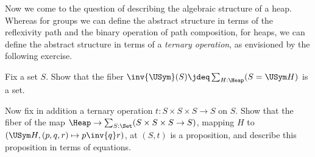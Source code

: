 Now we come to the question of describing the algebraic structure
of a heap.
Whereas for groups we can define the abstract structure
in terms of the reflexivity path and the binary operation of path composition,
for heaps, we can define the abstract structure
in terms of a \emph{ternary operation},
as envisioned by the following exercise.

\begin{exercise}\label{xca:heap-variety}
  Fix a set $S$.
  Show that the fiber $\inv{\USym}(S)\jdeq\sum_{H:\Heap}(S=\USym H)$ is a set.

  Now fix in addition a ternary operation $t:S\times S\times S\to S$ on $S$.
  Show that the fiber of the map $\Heap \to \sum_{S:\Set}(S\times S\times S \to S)$,
  mapping $H$ to $(\USym H,(p,q,r)\mapsto p \inv{q} r)$,
  at $(S,t)$ is a proposition,
  and describe this proposition in terms of equations.
\end{exercise}





